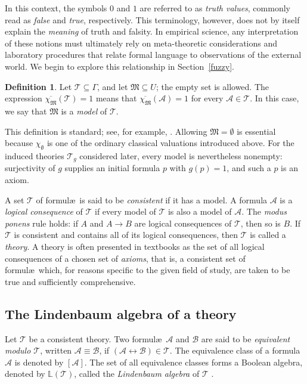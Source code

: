 \documentclass{article}   	%
\theoremstyle{plain}
\theoremstyle{definition}
\newtheorem{definition}[theorem]{Definition}
\theoremstyle{remark}
\begin{document}
In this context, the symbols $0$ and $1$ are referred to as \emph{truth values}, commonly read as \emph{false} and \emph{true}, respectively.
This terminology, however, does not by itself explain the \emph{meaning} of truth and falsity.
In empirical science, any interpretation of these notions must ultimately rely on meta-theoretic considerations and laboratory procedures
that relate formal language to observations of the external world.
We begin to explore this relationship in Section~\ref{fuzzy}.

\begin{definition}\label{def:model}
Let $\mathcal T\subseteq\Gamma$, and let $\mathfrak M\subseteq U$; the empty set is allowed.
The expression $\overline{\chi_{\mathfrak M}}(\mathcal T)=1$ means that
$\overline{\chi_{\mathfrak M}}(\mathcal A)=1$ for every $\mathcal A\in\mathcal T$.
In this case, we say that $\mathfrak M$ is a \emph{model} of $\mathcal T$.
\end{definition}
This definition is standard; see, for example, \cite[p.~4]{ChangKeisler}.
Allowing $\mathfrak M=\emptyset$ is essential because $\chi_{\emptyset}$ is one of the ordinary classical valuations introduced above.  For the induced theories $\mathcal T_g$ considered later, every model is nevertheless nonempty: surjectivity of $g$ supplies an initial formula $p$ with $g(p)=1$, and such a $p$ is an axiom.

A set $\mathcal T$ of formul\ae\ is said to be \emph{consistent} if it has a model.
A formula $\mathcal A$ is a \emph{logical consequence} of $\mathcal T$ if every model of $\mathcal T$ is also a model of $\mathcal A$.
The \emph{modus ponens} rule holds: if $A$ and $A \to B$ are logical consequences of $\mathcal T$, then so is $B$.
If $\mathcal T$ is consistent and contains all of its logical consequences, then $\mathcal T$ is called a \emph{theory}.
A theory is often presented in textbooks as the set of all logical consequences of a chosen set of \emph{axioms}, that is, a consistent set of formul\ae\ which, for reasons specific to the given field of study, are taken to be true and sufficiently comprehensive.

\subsection{The Lindenbaum algebra of a theory}
\label{subsec:lind}

Let $\mathcal T$ be a consistent theory.
Two formul\ae\ $\mathcal A$ and $\mathcal B$ are said to be \emph{equivalent modulo $\mathcal T$}, written $\mathcal A \equiv \mathcal B$, if
$(\mathcal A \leftrightarrow \mathcal B) \in \mathcal T$.
The equivalence class of a formula $\mathcal A$ is denoted by $[\mathcal A]$.
The set of all equivalence classes forms a Boolean algebra, denoted by $\mathbb{L}(\mathcal T)$, called the \emph{Lindenbaum algebra} of $\mathcal T$ \cite{Enderton,ChangKeisler}.
\end{document}
